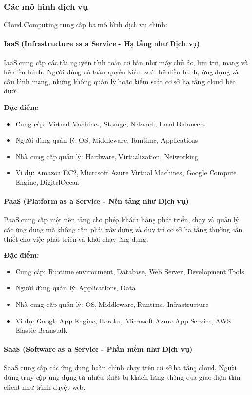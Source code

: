 \subsubsection{Các mô hình dịch vụ}
Cloud Computing cung cấp ba mô hình dịch vụ chính:

\paragraph{IaaS (Infrastructure as a Service - Hạ tầng như Dịch vụ)}
IaaS cung cấp các tài nguyên tính toán cơ bản như máy chủ ảo, lưu trữ, mạng và hệ điều hành. Người dùng có toàn quyền kiểm soát hệ điều hành, ứng dụng và cấu hình mạng, nhưng không quản lý hoặc kiểm soát cơ sở hạ tầng cloud bên dưới.

\textbf{Đặc điểm:}
\begin{itemize}
    \item Cung cấp: Virtual Machines, Storage, Network, Load Balancers
    \item Người dùng quản lý: OS, Middleware, Runtime, Applications
    \item Nhà cung cấp quản lý: Hardware, Virtualization, Networking
    \item Ví dụ: Amazon EC2, Microsoft Azure Virtual Machines, Google Compute Engine, DigitalOcean
\end{itemize}

\paragraph{PaaS (Platform as a Service - Nền tảng như Dịch vụ)}
PaaS cung cấp một nền tảng cho phép khách hàng phát triển, chạy và quản lý các ứng dụng mà không cần phải xây dựng và duy trì cơ sở hạ tầng thường cần thiết cho việc phát triển và khởi chạy ứng dụng.

\textbf{Đặc điểm:}
\begin{itemize}
    \item Cung cấp: Runtime environment, Database, Web Server, Development Tools
    \item Người dùng quản lý: Applications, Data
    \item Nhà cung cấp quản lý: OS, Middleware, Runtime, Infrastructure
    \item Ví dụ: Google App Engine, Heroku, Microsoft Azure App Service, AWS Elastic Beanstalk
\end{itemize}

\paragraph{SaaS (Software as a Service - Phần mềm như Dịch vụ)}
SaaS cung cấp các ứng dụng hoàn chỉnh chạy trên cơ sở hạ tầng cloud. Người dùng truy cập ứng dụng từ nhiều thiết bị khách hàng thông qua giao diện thin client như trình duyệt web.

